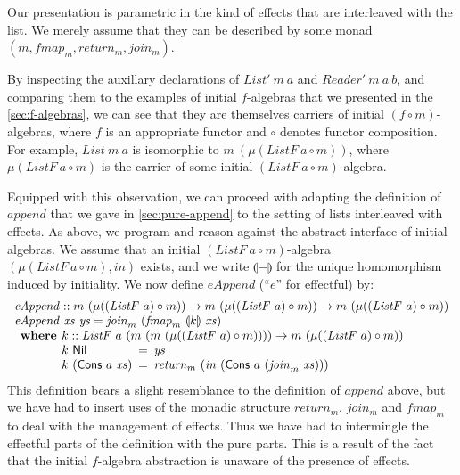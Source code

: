 \documentclass{jfp1}
\newcommand{\fold}[1]{\llparenthesis #1 \rrparenthesis}
\begin{document}
Our presentation is parametric in the kind of effects that
are interleaved with the list. We merely assume that they can be
described by some monad $(m, \mathit{fmap_m}, \mathit{return_m},
\mathit{join_m})$.

By inspecting the auxillary declarations of $\mathit{List'}~m~a$ and
$\mathit{Reader'}~m~a~b$, and comparing them to the examples of
initial $f$-algebras that we presented in the
\autoref{sec:f-algebras}, we can see that they are themselves carriers
of initial $(f \circ m)$-algebras, where $f$ is an appropriate functor
and $\circ$ denotes functor composition. For example,
$\mathit{List}~m~a$ is isomorphic to $m~(\mu (\mathit{ListF}~a \circ
m))$, where $\mu (\mathit{ListF}~a \circ m)$ is the carrier of some
initial $(\mathit{ListF}~a \circ m)$-algebra.

Equipped with this observation, we can proceed with adapting the
definition of $\mathit{append}$ that we gave in
\autoref{sec:pure-append} to the setting of lists interleaved with
effects. As above, we program and reason against the abstract
interface of initial algebras. We assume that an initial
$(\mathit{ListF}~a \circ m)$-algebra $(\mu(\mathit{ListF}~a \circ m),
\mathit{in})$ exists, and we write $\fold{-}$ for the unique
homomorphism induced by initiality. We now define $\mathit{eAppend}$
(``$\mathit{e}$'' for effectful) by:
\begin{displaymath}
  \begin{array}{l}
    \mathit{eAppend} :: m~(\mu ((\mathit{ListF}~a) \circ m)) \to m~(\mu ((\mathit{ListF}~a) \circ m)) \to m~(\mu ((\mathit{ListF}~a) \circ m)) \\
    \mathit{eAppend}~\mathit{xs}~\mathit{ys} = \mathit{join}_m~(\mathit{fmap}_m~\fold{k}~\mathit{xs}) \\
    \begin{array}{r@{\hspace{0.4em}}l}
      \textbf{where} & k :: \mathit{ListF}~a~(m~(m~(\mu ((\mathit{ListF}~a) \circ m)))) \to m~(\mu ((\mathit{ListF}~a) \circ m)) \\
                     &
                     \begin{array}{@{}l@{\hspace{0.5em}}c@{\hspace{0.5em}}l}
                       k~\mathsf{Nil} &=& \mathit{ys} \\
                       k~(\mathsf{Cons}~a~\mathit{xs}) &=& \mathit{return}_m~(\mathit{in}~(\mathsf{Cons}~a~(\mathit{join}_m~\mathit{xs})))
                     \end{array}
    \end{array}
  \end{array}
\end{displaymath}
This definition bears a slight resemblance to the definition of
$\mathit{append}$ above, but we have had to insert uses of the monadic
structure $\mathit{return_m}$, $\mathit{join_m}$ and $\mathit{fmap_m}$
to deal with the management of effects. Thus we have had to
intermingle the effectful parts of the definition with the pure
parts. This is a result of the fact that the initial $f$-algebra
abstraction is unaware of the presence of effects.
\end{document}

